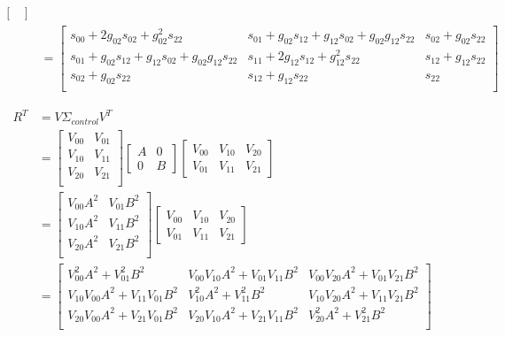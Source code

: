 \documentclass[oneside, 12pt, a4paper]{book}
\begin{document}
\begin{equation}
\begin{split}
\begin{bmatrix}
        \end{bmatrix}\\
        &= \begin{bmatrix}
            s_{00}+ 2g_{02}s_{02} + g_{02}^2s_{22} & s_{01} + g_{02}s_{12} + g_{12}s_{02} + g_{02}g_{12}s_{22} & s_{02} + g_{02}s_{22}\\
            s_{01} + g_{02}s_{12} + g_{12}s_{02} + g_{02}g_{12}s_{22} & s_{11} + 2g_{12}s_{12} + g_{12}^2s_{22}& s_{12} + g_{12}s_{22}\\
            s_{02} + g_{02}s_{22} & s_{12} + g_{12}s_{22} & s_{22}\\
        \end{bmatrix}
    \end{split}
\end{equation}

\begin{equation}
    \begin{split}
        R^T &= V \Sigma_{control} V^T \\
        &=\begin{bmatrix}
            V_{00} & V_{01}\\
            V_{10} & V_{11}\\
            V_{20} & V_{21}\\
        \end{bmatrix}
        \begin{bmatrix}
            A & 0\\
            0 & B
        \end{bmatrix}
        \begin{bmatrix}
            V_{00} & V_{10} & V_{20} \\
            V_{01} & V_{11} & V_{21}
        \end{bmatrix}\\
        &=\begin{bmatrix}
            V_{00}A^2 & V_{01}B^2\\
            V_{10}A^2 & V_{11}B^2\\
            V_{20}A^2 & V_{21}B^2\\
        \end{bmatrix}
        \begin{bmatrix}
            V_{00} & V_{10} & V_{20}\\
            V_{01} & V_{11} & V_{21}
        \end{bmatrix}\\
        &= \begin{bmatrix}
            V_{00}^2A^2 + V_{01}^2B^2 & V_{00}V_{10}A^2 + V_{01}V_{11}B^2 & V_{00}V_{20}A^2 + V_{01}V_{21}B^2 \\
            V_{10}V_{00}A^2 + V_{11}V_{01}B^2 & V_{10}^2A^2 + V_{11}^2B^2 &V_{10}V_{20}A^2 + V_{11}V_{21}B^2 \\
            V_{20}V_{00}A^2 + V_{21}V_{01}B^2 & V_{20}V_{10}A^2 + V_{21}V_{11}B^2 & V_{20}^2A^2 + V_{21}^2B^2 \\
        \end{bmatrix}
    \end{split}
\end{equation}
\end{document}
